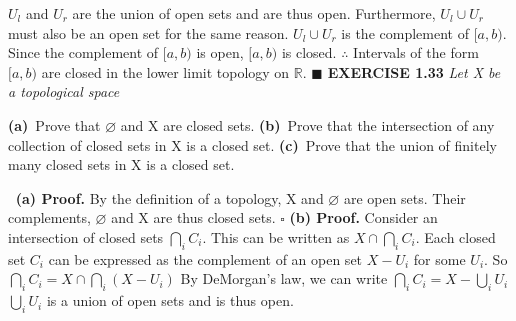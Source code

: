 \documentclass[12pt]{article}
\begin{document}
	\(U_l\) and \(U_r\) are the union of open sets and are thus open. \newline
	Furthermore, \(U_l \cup U_r\) must also be an open set for the same reason. \newline \newline
	\(U_l \cup U_r\) is the complement of \([a,b)\).
	\newline
	Since the complement of \([a,b)\) is open, \([a,b)\) is closed.
	\newline \newline
	\(\therefore\) Intervals of the form \([a,b)\) are closed in the lower limit topology on \(\mathbb{R}\).
	\newline \(\blacksquare\)
	\newpage
	\noindent
	\textbf{EXERCISE 1.33} \textit{Let X be a topological space}
	\begin{adjustwidth}{0.8cm}{0cm}
		\textbf{(a)}\ Prove that \(\varnothing\) and X are closed sets. \newline
		\textbf{(b)}\ Prove that the intersection of any collection of closed sets in X is a closed set. \newline
		\textbf{(c)}\ Prove that the union of finitely many closed sets in X is a closed set.
	\end{adjustwidth}
	\(\ \)
	\newline
	\textbf{(a) Proof.} \newline
	By the definition of a topology, X and \(\varnothing\) are open sets. \newline
	Their complements, \(\varnothing\) and X are thus closed sets.
	\newline \(\square\) \newline \newline
	\textbf{(b) Proof.} \newline
	Consider an intersection of closed sets \(\bigcap_i C_i\).
	\newline
	This can be written as \(X \cap \bigcap_i C_i\).
	\newline \newline
	Each closed set \(C_i\) can be expressed as the complement of an open set \(X - U_i\) for some \(U_i\).
	\newline
	So \(\bigcap_i C_i = X \cap \bigcap_i (X - U_i)\)
	\newline
	By DeMorgan's law, we can write
	\(\bigcap_i C_i = X - \bigcup_i U_i\)
	\newline \newline
	\(\bigcup_i U_i\) is a union of open sets and is thus open.
	\newline
\end{document}
